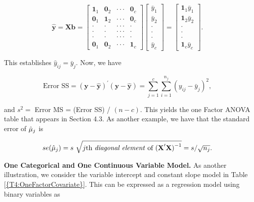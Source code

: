 \begin{center}
\[
\mathbf{\hat{y}}=\mathbf{Xb}=
\begin{bmatrix}
\mathbf{1}_1 & \mathbf{0}_2 & \cdot \cdot \cdot  & \mathbf{0}_c \\
\mathbf{0}_1 & \mathbf{1}_2 & \cdot \cdot \cdot  & \mathbf{0}_c \\
\cdot  & \cdot  & \cdot \cdot \cdot  & \cdot  \\
\cdot  & \cdot  & \cdot \cdot \cdot  & \cdot  \\
\cdot  & \cdot  & \cdot \cdot \cdot  & \cdot  \\
\mathbf{0}_{1} & \mathbf{0}_{2} & \cdot \cdot \cdot  & \mathbf{1}_c%
\end{bmatrix}
\begin{bmatrix}
\bar{y}_{1} \\
\bar{y}_{2} \\
\cdot  \\
\cdot  \\
\cdot  \\
\bar{y}_{c}%
\end{bmatrix}%
=%
\begin{bmatrix}
\mathbf{1}_{1}\bar{y}_{1} \\
\mathbf{1}_{2}\bar{y}_{2} \\
\cdot  \\
\cdot  \\
\cdot  \\
\mathbf{1}_{c}\bar{y}_{c}%
\end{bmatrix}%
.
\]
\end{center}

\noindent This establishes $\hat{y}_{ij}=\bar{y}_{j}$. Now, we have

\begin{center}
\[
\text{Error SS}=\mathbf{(y-\hat{y})^{\prime }(y-\hat{y})}=\sum_{j=1}^{c}%
\sum_{i=1}^{n_{j}}(y_{ij}-\bar{y}_{j})^{2},
\]
\end{center}

\noindent and $s^{2}=$ Error MS = (Error SS) / $(n-c)$. This yields
the one Factor ANOVA table that appears in Section 4.3. As
another example, we have that the standard error of $\hat{%
\mu}_{j}$ is

\begin{center}
\[
se(\hat{\mu}_{j})=s ~ \sqrt{j\text{th \textit{diagonal element} of }\mathbf{(X}%
^{\prime }\mathbf{X)}^{-1}}=s/\sqrt{n_{j}}.
\]
\end{center}

\textbf{One Categorical and One Continuous Variable Model.} As
another illustration, we consider the variable intercept and
constant slope model in Table \ref{{T4:OneFactorCovariate}}. This
can be expressed as a regression model using binary variables as

